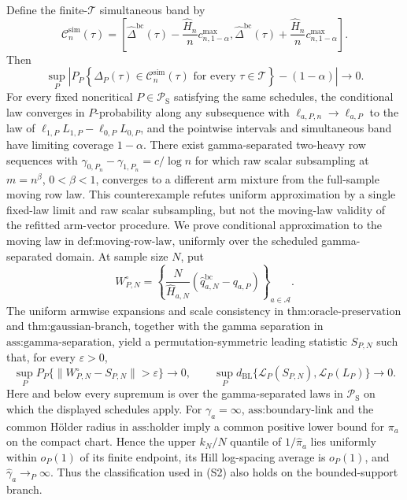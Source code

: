 Define the finite-\(\mathcal T\) simultaneous band by
\[
\mathcal C_n^{\mathrm{sim}}(\tau)=
\left[
\widehat\Delta^{\mathrm{bc}}(\tau)-\frac{\widehat H_n}{n}c^{\max}_{n,1-\alpha},
\widehat\Delta^{\mathrm{bc}}(\tau)+\frac{\widehat H_n}{n}c^{\max}_{n,1-\alpha}
\right].
\]
Then
\[
\sup_P\left|
P_P\!\left\{\Delta_P(\tau)\in\mathcal C_n^{\mathrm{sim}}(\tau)
\text{ for every }\tau\in\mathcal T\right\}-(1-\alpha)
\right|\longrightarrow0.
\]
For every fixed noncritical \(P\in\mathcal P_{\mathrm S}\) satisfying the same schedules, the conditional law converges in \(P\)-probability along any subsequence with \(\ell_{a,P,n}\to\ell_{a,P}\) to the law of \(\ell_{1,P}L_{1,P}-\ell_{0,P}L_{0,P}\), and the pointwise intervals and simultaneous band have limiting coverage \(1-\alpha\). There exist gamma-separated two-heavy row sequences with \(\gamma_{0,P_n}-\gamma_{1,P_n}=c/\log n\) for which raw scalar subsampling at \(m=n^\beta\), \(0<\beta<1\), converges to a different arm mixture from the full-sample moving row law. This counterexample refutes uniform approximation by a single fixed-law limit and raw scalar subsampling, but not the moving-law validity of the refitted arm-vector procedure.
We prove conditional approximation to the moving law in \(\text{def:moving-row-law}\), uniformly over the scheduled gamma-separated domain. At sample size \(N\), put
\[
W_{P,N}^{\circ}=\left\{
\frac N{\widehat H_{a,N}}(\widehat q_{a,N}^{\mathrm{bc}}-q_{a,P})
\right\}_{a\in\mathcal A}.
\tag{S1}
\]
The uniform armwise expansions and scale consistency in \(\text{thm:oracle-preservation}\) and \(\text{thm:gaussian-branch}\), together with the gamma separation in \(\text{ass:gamma-separation}\), yield a permutation-symmetric leading statistic \(S_{P,N}\) such that, for every \(\varepsilon>0\),
\[
\sup_PP_P\{\|W_{P,N}^{\circ}-S_{P,N}\|>\varepsilon\}\to0,
\qquad
\sup_Pd_{\mathrm{BL}}\{\mathcal L_P(S_{P,N}),\mathcal L_P(L_P)\}\to0.
\tag{S2}
\]
Here and below every supremum is over the gamma-separated laws in \(\mathcal P_{\mathrm S}\) on which the displayed schedules apply. For \(\gamma_a=\infty\), \(\text{ass:boundary-link}\) and the common Hölder radius in \(\text{ass:holder}\) imply a common positive lower bound for \(\pi_a\) on the compact chart. Hence the upper \(k_N/N\) quantile of \(1/\widehat\pi_a\) lies uniformly within \(o_P(1)\) of its finite endpoint, its Hill log-spacing average is \(o_P(1)\), and \(\widehat\gamma_a\to_P\infty\). Thus the classification used in (S2) also holds on the bounded-support branch.

